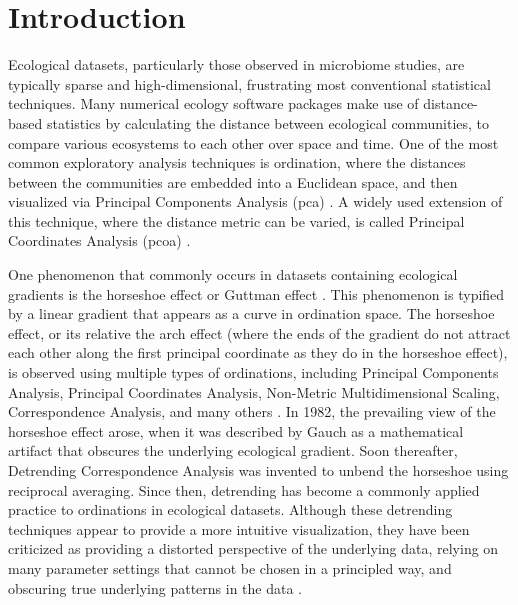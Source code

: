 \section{Introduction}
Ecological datasets, particularly those observed in microbiome studies, are typically sparse and high-dimensional, frustrating most conventional statistical techniques.  Many numerical ecology software packages make use of distance-based statistics by calculating the distance between ecological communities, to compare various ecosystems to each other over space and time.  One of the most common exploratory analysis techniques is ordination, where the distances between the communities are embedded into a Euclidean space, and then visualized via Principal Components Analysis (\gls{pca}) \cite{numerical_ecology}.  A widely used extension of this technique, where the distance metric can be varied, is called Principal Coordinates Analysis (\gls{pcoa}) \cite{numerical_ecology}.  \par
One phenomenon that commonly occurs in datasets containing ecological gradients is the horseshoe effect or Guttman effect \cite{global_patterns}.  This phenomenon is typified by a linear gradient that appears as a curve in ordination space. The horseshoe effect, or its relative the arch effect \cite{detrended_correspondence_analysis} (where the ends of the gradient do not attract each other along the first principal coordinate as they do in the horseshoe effect), is observed using multiple types of ordinations, including Principal Components Analysis, Principal Coordinates Analysis, Non-Metric Multidimensional Scaling, Correspondence Analysis, and many others \cite{numerical_ecology}.  In 1982, the prevailing view of the horseshoe effect arose, when it was described by Gauch as a mathematical artifact that obscures the underlying ecological gradient.  Soon thereafter, Detrending Correspondence Analysis \cite{detrended_correspondence_analysis} was invented to unbend the horseshoe using reciprocal averaging. Since then, detrending has become a commonly applied practice to ordinations in ecological datasets.   Although these detrending techniques appear to provide a more intuitive visualization, they have been criticized as providing a distorted perspective of the underlying data, relying on many parameter settings that cannot be chosen in a principled way, and obscuring true underlying patterns in the data \cite{trust_dca}.\par
